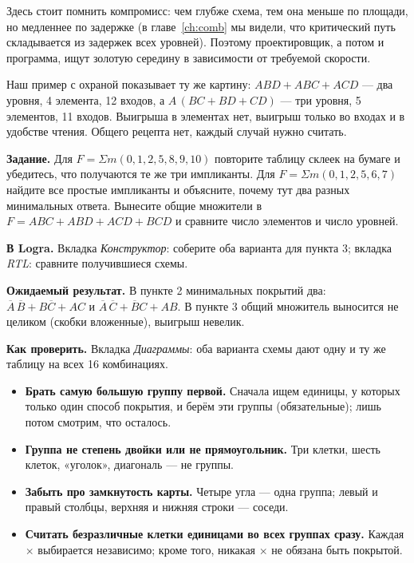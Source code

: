Здесь стоит помнить компромисс: чем глубже схема, тем она меньше по площади,
но медленнее по задержке (в главе~\ref{ch:comb} мы видели, что критический
путь складывается из задержек всех уровней). Поэтому проектировщик, а потом
и программа, ищут золотую середину в зависимости от требуемой скорости.

Наш пример с охраной показывает ту же картину: $ABD+ABC+ACD$ --- два уровня,
4 элемента, 12 входов, а $A\,(BC+BD+CD)$ --- три уровня, 5 элементов, 11
входов. Выигрыша в элементах нет, выигрыш только во входах и в удобстве
чтения. Общего рецепта нет, каждый случай нужно считать.

\begin{diybox}
\textbf{Задание.}  Для $F=\Sigma m(0,1,2,5,8,9,10)$ повторите
таблицу склеек на бумаге и убедитесь, что получаются те же три
импликанты.  Для $F=\Sigma m(0,1,2,5,6,7)$ найдите все простые
импликанты и объясните, почему тут два разных минимальных ответа. 
Вынесите общие множители в $F=ABC+ABD+ACD+BCD$ и сравните число
элементов и число уровней.

\textbf{В Logra.} Вкладка \emph{Конструктор}: соберите оба варианта для
пункта 3; вкладка \emph{RTL}: сравните получившиеся схемы.

\textbf{Ожидаемый результат.} В пункте 2 минимальных покрытий два:
$\overline{A}\,\overline{B}+B\overline{C}+AC$ и
$\overline{A}\,\overline{C}+\overline{B}C+AB$. В пункте 3 общий множитель
выносится не целиком (скобки вложенные), выигрыш невелик.

\textbf{Как проверить.} Вкладка \emph{Диаграммы}: оба варианта схемы
дают одну и ту же таблицу на всех 16 комбинациях.
\end{diybox}

\begin{warnbox}
\begin{itemize}
  \item \textbf{Брать самую большую группу первой.} Сначала ищем единицы,
        у которых только один способ покрытия, и берём эти группы
        (обязательные); лишь потом смотрим, что осталось.
  \item \textbf{Группа не степень двойки или не прямоугольник.} Три
        клетки, шесть клеток, «уголок», диагональ --- не группы.
  \item \textbf{Забыть про замкнутость карты.} Четыре угла --- одна
        группа; левый и правый столбцы, верхняя и нижняя строки --- соседи.
  \item \textbf{Считать безразличные клетки единицами во всех группах
        сразу.} Каждая $\times$ выбирается независимо; кроме того, никакая
        $\times$ не обязана быть покрытой.
\end{itemize}
\end{warnbox}

